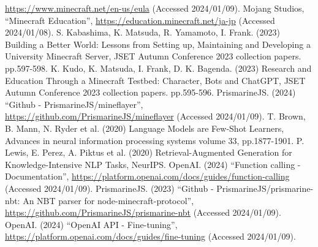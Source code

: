 \begin{thebibliography}{99}
    \url{https://www.minecraft.net/en-us/eula} (Accessed 2024/01/09).
    Mojang Studios, 
    ``Minecraft Education'', 
    \url{https://education.minecraft.net/ja-jp} (Accessed 2024/01/08).
    S. Kabashima, K. Matsuda, R. Yamamoto, I. Frank. (2023) 
    Building a Better World: Lessons from Setting up, Maintaining and Developing a University Minecraft Server, 
    JSET Autumn Conference 2023 collection papers. pp.597-598.
    K. Kudo, K. Matsuda, I. Frank, D. K. Bagenda. (2023)
    Research and Education Through a Minecraft Testbed: Character, Bots and ChatGPT,
    JSET Autumn Conference 2023 collection papers. pp.595-596.
    PrismarineJS. (2024) 
    ``Github - PrismarineJS/mineflayer'', 
    \url{https://github.com/PrismarineJS/mineflayer} (Accessed 2024/01/09).
    T. Brown, B. Mann, N. Ryder et al. (2020) 
    Language Models are Few-Shot Learners, 
    Advances in neural information processing systems volume 33, pp.1877-1901.
    P. Lewis, E. Perez, A. Piktus et al. (2020) 
    Retrieval-Augmented Generation for Knowledge-Intensive NLP Tasks, 
    NeurIPS.
    OpenAI. (2024)
    ``Function calling -Documentation'',
    \url{https://platform.openai.com/docs/guides/function-calling} (Accessed 2024/01/09).
    PrismarineJS. (2023) 
    ``Github - PrismarineJS/prismarine-nbt: An NBT parser for node-minecraft-protocol'', 
    \url{https://github.com/PrismarineJS/prismarine-nbt} (Accessed 2024/01/09).
    OpenAI. (2024) 
    ``OpenAI API - Fine-tuning'', 
    \url{https://platform.openai.com/docs/guides/fine-tuning} (Accessed 2024/01/09).







\end{thebibliography}
